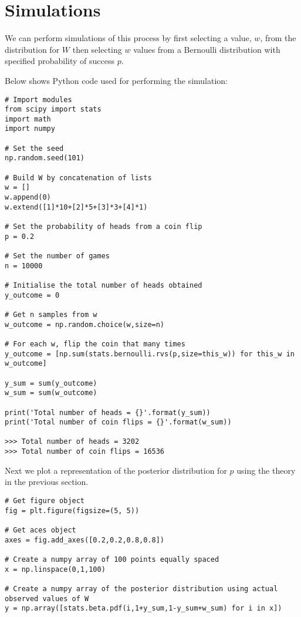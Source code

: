 \documentclass{article}
\begin{document}
\section{Simulations} %
\begin{flushleft}
We can perform simulations of this process by first selecting a value, $w$, from the distribution for $W$ then selecting $w$ values from a Bernoulli distribution with specified probability of success $p$.\newline

Below shows Python code used for performing the simulation:

\begin{lstlisting}
# Import modules
from scipy import stats
import math
import numpy

# Set the seed
np.random.seed(101)

# Build W by concatenation of lists
w = []
w.append(0)
w.extend([1]*10+[2]*5+[3]*3+[4]*1)

# Set the probability of heads from a coin flip
p = 0.2

# Set the number of games
n = 10000

# Initialise the total number of heads obtained
y_outcome = 0

# Get n samples from w
w_outcome = np.random.choice(w,size=n)

# For each w, flip the coin that many times
y_outcome = [np.sum(stats.bernoulli.rvs(p,size=this_w)) for this_w in w_outcome]

y_sum = sum(y_outcome)
w_sum = sum(w_outcome)

print('Total number of heads = {}'.format(y_sum))
print('Total number of coin flips = {}'.format(w_sum))

>>> Total number of heads = 3202
>>> Total number of coin flips = 16536
\end{lstlisting}

Next we plot a representation of the posterior distribution for $p$ using the theory in the previous section.

\begin{lstlisting}
# Get figure object
fig = plt.figure(figsize=(5, 5))

# Get aces object
axes = fig.add_axes([0.2,0.2,0.8,0.8])

# Create a numpy array of 100 points equally spaced
x = np.linspace(0,1,100)

# Create a numpy array of the posterior distribution using actual observed values of W
y = np.array([stats.beta.pdf(i,1+y_sum,1-y_sum+w_sum) for i in x])


\end{lstlisting}
\end{flushleft}
\end{document}

